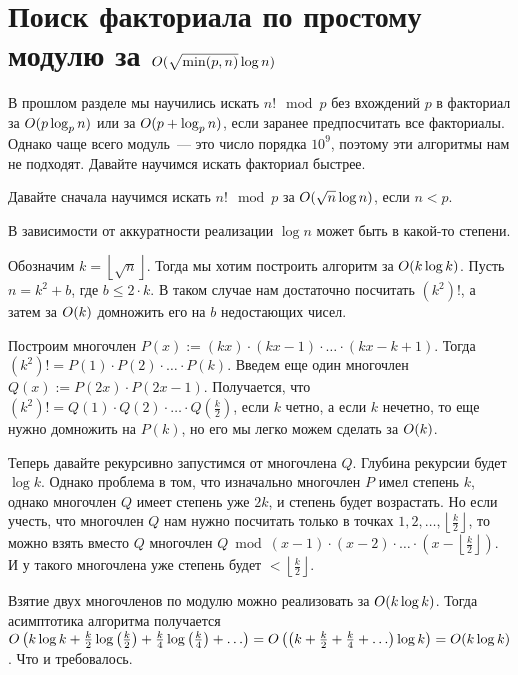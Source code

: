 \chapter{Поиск факториала по простому модулю за $O(\sqrt{\min (p, n)} \log n)$}

В прошлом разделе мы научились искать $n! \mod p$ без вхождений $p$ в факториал за $O(p \log_p n)$ или за $O(p + \log_p n)$, если заранее предпосчитать все факториалы. Однако чаще всего модуль~--- это число порядка $10^9$, поэтому эти алгоритмы нам не подходят. Давайте научимся искать факториал быстрее.

Давайте сначала научимся искать $n! \mod p$ за $O(\sqrt{n} \log n)$, если $n < p$.

\begin{observation}
    В зависимости от аккуратности реализации $\log n$ может быть в какой-то степени.
\end{observation}

Обозначим $k = \left\lfloor \sqrt{n} \right\rfloor$. Тогда мы хотим построить алгоритм за $O(k \log k)$. Пусть $n = k^2 + b$, где $b \le 2 \cdot k$. В таком случае нам достаточно посчитать $\left(k^2\right)!$, а затем за $O(k)$ домножить его на $b$ недостающих чисел.

Построим многочлен $P(x) := (kx) \cdot (kx - 1) \cdot \ldots \cdot (kx - k + 1)$. Тогда $\left(k^2\right)! = P(1) \cdot P(2) \cdot \ldots \cdot P(k)$. Введем еще один многочлен $Q(x) := P(2x) \cdot P(2x - 1)$. Получается, что $\left(k^2\right)! = Q(1) \cdot Q(2) \cdot \ldots \cdot Q\left(\frac{k}{2}\right)$, если $k$ четно, а если $k$ нечетно, то еще нужно домножить на $P(k)$, но его мы легко можем сделать за $O(k)$.

Теперь давайте рекурсивно запустимся от многочлена $Q$. Глубина рекурсии будет $\log k$. Однако проблема в том, что изначально многочлен $P$ имел степень $k$, однако многочлен $Q$ имеет степень уже $2k$, и степень будет возрастать. Но если учесть, что многочлен $Q$ нам нужно посчитать только в точках $1, 2, \ldots, \left\lfloor \frac{k}{2} \right\rfloor$, то можно взять вместо $Q$ многочлен $Q \bmod (x - 1) \cdot (x - 2) \cdot \ldots \cdot (x - \left\lfloor \frac{k}{2} \right\rfloor)$. И у такого многочлена уже степень будет $< \left\lfloor \frac{k}{2} \right\rfloor$.

Взятие двух многочленов по модулю можно реализовать за $O(k \log k)$. Тогда асимптотика алгоритма получается $O\left(k \log k + \frac{k}{2} \log \left( \frac{k}{2} \right) + \frac{k}{4} \log \left(\frac{k}{4} \right) + \ldots\right) = O\left(\left(k + \frac{k}{2} + \frac{k}{4} + \ldots\right) \log k\right) = O(k \log k)$. Что и требовалось.

